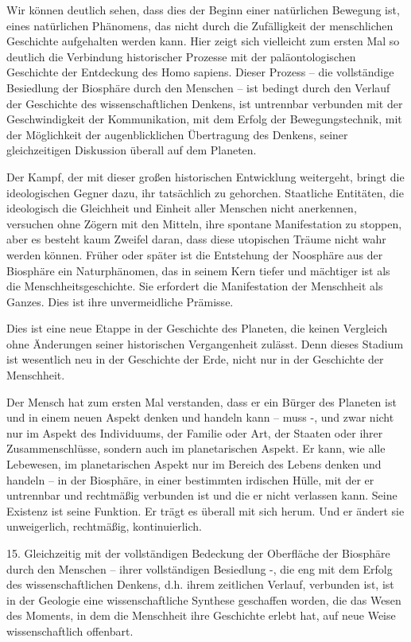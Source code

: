 \documentclass[11pt,a4paper]{book}
\begin{document}
Wir können deutlich sehen, dass dies der Beginn einer natürlichen Bewegung ist, eines natürlichen Phänomens, das nicht durch die Zufälligkeit der menschlichen Geschichte aufgehalten werden kann. Hier zeigt sich vielleicht zum ersten Mal so deutlich die Verbindung historischer Prozesse mit der paläontologischen Geschichte der Entdeckung des Homo sapiens. Dieser Prozess -- die vollständige Besiedlung der Biosphäre durch den Menschen -- ist bedingt durch den Verlauf der Geschichte des wissenschaftlichen Denkens, ist untrennbar verbunden mit der Geschwindigkeit der Kommunikation, mit dem Erfolg der Bewegungstechnik, mit der Möglichkeit der augenblicklichen Übertragung des Denkens, seiner gleichzeitigen Diskussion überall auf dem Planeten. 

Der Kampf, der mit dieser großen historischen Entwicklung weitergeht, bringt die ideologischen Gegner dazu, ihr tatsächlich zu gehorchen. Staatliche Entitäten, die ideologisch die Gleichheit und Einheit aller Menschen nicht anerkennen, versuchen ohne Zögern mit den Mitteln, ihre spontane Manifestation zu stoppen, aber es besteht kaum Zweifel daran, dass diese utopischen Träume nicht wahr werden können. Früher oder später ist die Entstehung der Noosphäre aus der Biosphäre ein Naturphänomen, das in seinem Kern tiefer und mächtiger ist als die Menschheitsgeschichte. Sie erfordert die Manifestation der Menschheit als Ganzes. Dies ist ihre unvermeidliche Prämisse. 

Dies ist eine neue Etappe in der Geschichte des Planeten, die keinen Vergleich ohne Änderungen seiner historischen Vergangenheit zulässt. Denn dieses Stadium ist wesentlich neu in der Geschichte der Erde, nicht nur in der Geschichte der Menschheit. 

Der Mensch hat zum ersten Mal verstanden, dass er ein Bürger des Planeten ist und in einem neuen Aspekt denken und handeln kann -- muss -, und zwar nicht nur im Aspekt des Individuums, der Familie oder Art, der Staaten oder ihrer Zusammenschlüsse, sondern auch im planetarischen Aspekt. Er kann, wie alle Lebewesen, im planetarischen Aspekt nur im Bereich des Lebens denken und handeln -- in der Biosphäre, in einer bestimmten irdischen Hülle, mit der er untrennbar und rechtmäßig verbunden ist und die er nicht verlassen kann. Seine Existenz ist seine Funktion. Er trägt es überall mit sich herum. Und er ändert sie unweigerlich, rechtmäßig, kontinuierlich. 

15. Gleichzeitig mit der vollständigen Bedeckung der Oberfläche der Biosphäre durch den Menschen -- ihrer vollständigen Besiedlung -, die eng mit dem Erfolg des wissenschaftlichen Denkens, d.h. ihrem zeitlichen Verlauf, verbunden ist, ist in der Geologie eine wissenschaftliche Synthese geschaffen worden, die das Wesen des Moments, in dem die Menschheit ihre Geschichte erlebt hat, auf neue Weise wissenschaftlich offenbart. 
\end{document}
